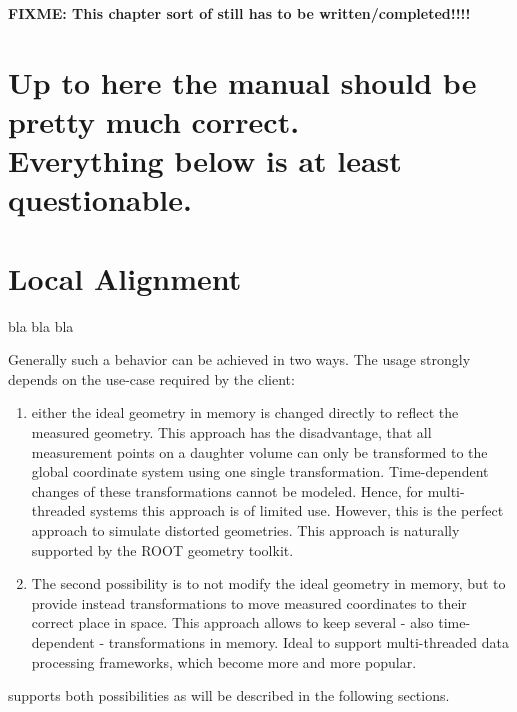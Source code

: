 \documentclass[10pt,a4paper]{article}
\begin{document}
\noindent
{\bf{FIXME: This chapter sort of still has to be written/completed!!!!}}

\newpage

\section{Up to here the manual should be pretty much correct.\\
Everything below is at least questionable.}

\section{Local Alignment}
\label{sect:ddalign-local-aligments}
bla bla bla









\noindent
Generally such a behavior can be achieved in two ways. The usage strongly depends
on the use-case required by the client:
\begin{enumerate}
\item either the ideal geometry in memory is changed directly to 
      reflect the  measured geometry. This approach has the 
      disadvantage, that all measurement points on a daughter 
      volume can only be transformed to the global coordinate
      system using one single transformation. Time-dependent changes of 
      these transformations cannot be modeled. Hence, for multi-threaded
      systems this approach is of limited use. However, this is the 
      perfect approach to simulate distorted geometries. This approach 
      is naturally supported by the ROOT geometry toolkit.
\item The second possibility is to not modify the ideal geometry in memory,
      but to provide instead transformations to move measured coordinates 
      to their correct place in space. This approach allows to keep 
      several - also time-dependent - transformations in memory. 
      Ideal to support multi-threaded data processing frameworks, 
      which become more and more popular.
\end{enumerate}

\noindent
\DDA supports both possibilities as will be described in the following sections.
\end{document}
